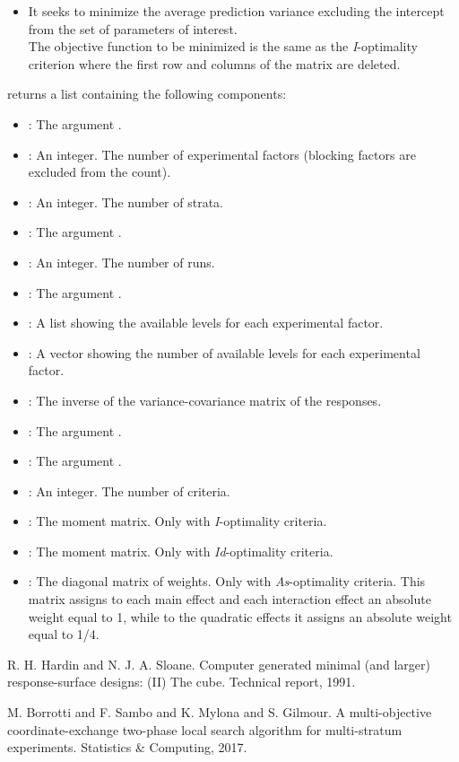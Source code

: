 \documentclass[a4paper]{book}
\begin{document}
\begin{Details}
\begin{itemize}
\item{}   It seeks to minimize the average
prediction variance excluding the intercept from the set of parameters of
interest. \\{}
The objective function to be minimized is the same as the
\emph{I}-optimality criterion where the first row and columns of the 
matrix are deleted.

\end{itemize}

\end{Details}
%
\begin{Value}
 returns a list containing the following components:
\begin{itemize}

\item{} : The argument .
\item{} : An integer. The number of experimental factors (blocking factors are excluded from the count).
\item{} : An integer. The number of strata.
\item{} : The argument .
\item{} : An integer. The number of runs.
\item{} : The argument .
\item{} : A list showing the available levels for each experimental factor.
\item{} : A vector showing the number of available levels for each experimental factor.
\item{} : The inverse of the variance-covariance matrix of the responses.
\item{} : The argument .
\item{} : The argument .
\item{} : An integer. The number of criteria.
\item{} : The moment matrix. Only with \emph{I}-optimality criteria.
\item{} : The moment matrix. Only with \emph{Id}-optimality criteria.
\item{} : The diagonal matrix of weights. Only with \emph{As}-optimality criteria.
This matrix assigns to each main effect and each interaction effect an absolute
weight equal to 1, while to the quadratic effects it assigns an absolute weight
equal to 1/4.

\end{itemize}

\end{Value}
%
\begin{References}\relax
R. H. Hardin and N. J. A. Sloane. Computer generated minimal (and larger)
response-surface designs: (II) The cube. Technical report, 1991.

M. Borrotti and F. Sambo and K. Mylona and S. Gilmour. A multi-objective
coordinate-exchange two-phase local search algorithm for multi-stratum
experiments. Statistics \& Computing, 2017.
\end{References}
\printindex{}
\end{document}
